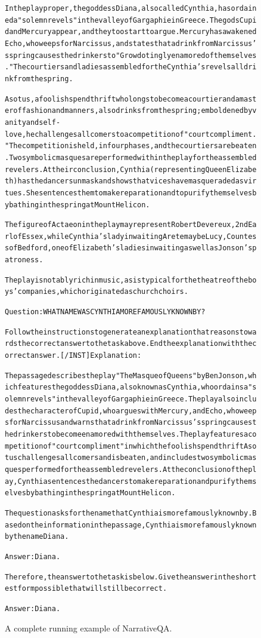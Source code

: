 \begin{figure}[t]
{{\begin{alltt}
In the play proper, the goddess Diana, also called Cynthia, has ordained a "solemn revels" in the valley of Gargaphie in Greece. The gods Cupid and Mercury appear, and they too start to argue. Mercury has awakened Echo, who weeps for Narcissus, and states that a drink from Narcissus's spring causes the drinkers to "Grow dotingly enamored of themselves." The courtiers and ladies assembled for the Cynthia's revels all drink from the spring.

Asotus, a foolish spendthrift who longs to become a courtier and a master of fashion and manners, also drinks from the spring; emboldened by vanity and self-love, he challenges all comers to a competition of "court compliment." The competition is held, in four phases, and the courtiers are beaten. Two symbolic masques are performed within the play for the assembled revelers. At their conclusion, Cynthia (representing Queen Elizabeth) has the dancers unmask and shows that vices have masqueraded as virtues. She sentences them to make reparation and to purify themselves by bathing in the spring at Mount Helicon.

The figure of Actaeon in the play may represent Robert Devereux, 2nd Earl of Essex, while Cynthia's lady in waiting Arete may be Lucy, Countess of Bedford, one of Elizabeth's ladies in waiting as well as Jonson's patroness.

The play is notably rich in music, as is typical for the theatre of the boys' companies, which originated as church choirs.

Question: WHAT NAME WAS CYNTHIA MORE FAMOUSLY KNOWN BY?

Follow the instructions to generate an explanation that reasons towards the correct answer to the task above. End the explanation with the correct answer. [/INST] Explanation: 

The passage describes the play "The Masque of Queens" by Ben Jonson, which features the goddess Diana, also known as Cynthia, who ordains a "solemn revels" in the valley of Gargaphie in Greece. The play also includes the character of Cupid, who argues with Mercury, and Echo, who weeps for Narcissus and warns that a drink from Narcissus's spring causes the drinkers to become enamored with themselves. The play features a competition of "court compliment" in which the foolish spendthrift Asotus challenges all comers and is beaten, and includes two symbolic masques performed for the assembled revelers. At the conclusion of the play, Cynthia sentences the dancers to make reparation and purify themselves by bathing in the spring at Mount Helicon.

The question asks for the name that Cynthia is more famously known by. Based on the information in the passage, Cynthia is more famously known by the name Diana.

Answer: Diana.

Therefore, the answer to the task is below. Give the answer in the shortest form possible that will still be correct.

Answer: Diana.
\end{alltt}
}}
\caption{A complete running example of NarrativeQA.}
\label{fig:narrative_qa_example}
\end{figure}
